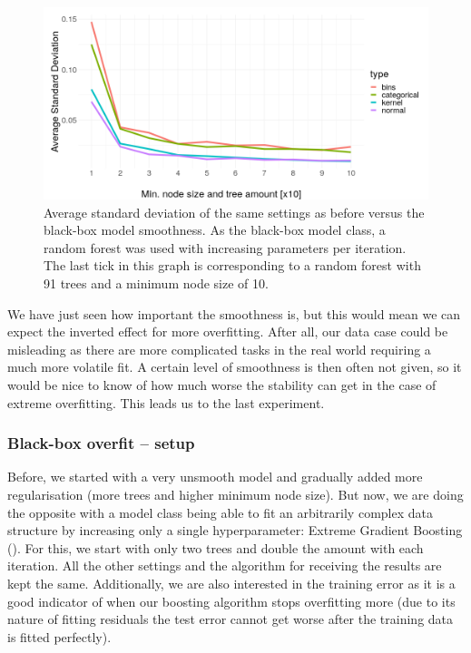 \documentclass[
]{krantz}
\begin{document}
\begin{figure}

{\centering \includegraphics[width=13.89in]{images/sd_smoothness_presi2} 

}

\caption{Average standard deviation of the same settings as before versus the black-box model smoothness. As the black-box model class, a random forest was used with increasing parameters per iteration. The last tick in this graph is corresponding to a random forest with 91 trees and a minimum node size of 10.}\label{fig:figsmooth}
\end{figure}

We have just seen how important the smoothness is, but this would mean we can expect the inverted effect for more overfitting.
After all, our data case could be misleading as there are more complicated tasks in the real world requiring a much more volatile fit.
A certain level of smoothness is then often not given, so it would be nice to know of how much worse the stability can get in the case of extreme overfitting.
This leads us to the last experiment.

\hypertarget{black-box-overfit-setup}{%
\subsubsection{Black-box overfit -- setup}\label{black-box-overfit-setup}}

Before, we started with a very unsmooth model and gradually added more regularisation (more trees and higher minimum node size).
But now, we are doing the opposite with a model class being able to fit an arbitrarily complex data structure by increasing only a single hyperparameter: Extreme Gradient Boosting (\citet{XGBoost}).
For this, we start with only two trees and double the amount with each iteration.
All the other settings and the algorithm for receiving the results are kept the same.
Additionally, we are also interested in the training error as it is a good indicator of when our boosting algorithm stops overfitting more (due to its nature of fitting residuals the test error cannot get worse after the training data is fitted perfectly).
\end{document}

